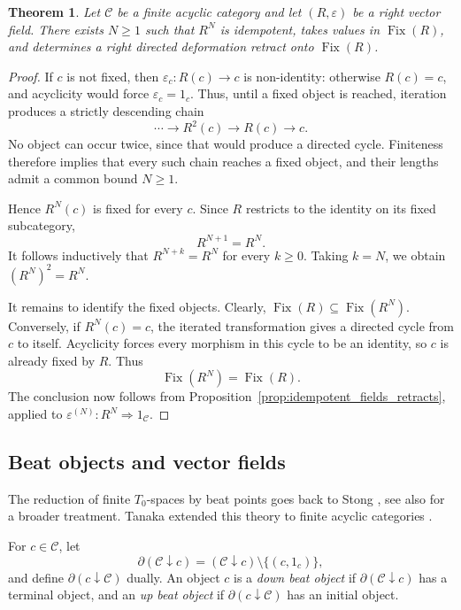 \documentclass[12pt]{amsart}
\newtheorem{theorem}[teo]{Theorem}
\theoremstyle{definition}
\theoremstyle{remark}
\numberwithin{figure}{section}%
\newcommand{\CC}{\mathcal{C}}
\begin{document}
\begin{theorem}\label{thm:vector_field_stabilization}
Let \(\CC\) be a finite acyclic category and let
\((R,\varepsilon)\) be a right vector field. There exists \(N\geq1\) such
that \(R^N\) is idempotent, takes values in
\(\operatorname{Fix}(R)\), and determines a right directed deformation
retract onto \(\operatorname{Fix}(R)\).
\end{theorem}

\begin{proof}
If \(c\) is not fixed, then \(\varepsilon_c\colon R(c)\to c\) is
non-identity: otherwise \(R(c)=c\), and acyclicity would force
\(\varepsilon_c=1_c\). Thus, until a fixed object is reached, iteration
produces a strictly descending chain
\[
\cdots\longrightarrow R^2(c)\longrightarrow R(c)\longrightarrow c.
\]
No object can occur twice, since that would produce a directed cycle.
Finiteness therefore implies that every such chain reaches a fixed
object, and their lengths admit a common bound \(N\geq1\).

Hence \(R^N(c)\) is fixed for every \(c\). Since \(R\) restricts to the
identity on its fixed subcategory,
\[
R^{N+1}=R^N.
\]
It follows inductively that \(R^{N+k}=R^N\) for every \(k\geq0\).
Taking \(k=N\), we obtain \((R^N)^2=R^N\).

It remains to identify the fixed objects. Clearly,
\(\operatorname{Fix}(R)\subseteq\operatorname{Fix}(R^N)\). Conversely,
if \(R^N(c)=c\), the iterated transformation gives a directed cycle from
\(c\) to itself. Acyclicity forces every morphism in this cycle to be an
identity, so \(c\) is already fixed by \(R\). Thus
\[
\operatorname{Fix}(R^N)=\operatorname{Fix}(R).
\]
The conclusion now follows from
Proposition~\ref{prop:idempotent_fields_retracts}, applied to
\(\varepsilon^{(N)}\colon R^N\Rightarrow1_\CC\).
\end{proof}

\subsection{Beat objects and vector fields}
\label{subsec:beat_objects_vector_fields}

The reduction of finite \(T_0\)-spaces by beat points goes back to Stong
\cite{Stong}, see also \cite{MR3024764} for a broader treatment. Tanaka extended this theory to finite acyclic categories \cite{StrongHomTan,SimpleHom_Tan}.

For \(c\in\CC\), let
\[
\partial(\CC\downarrow c)
=
(\CC\downarrow c)\setminus\{(c,1_c)\},
\]
and define \(\partial(c\downarrow\CC)\) dually. An object \(c\) is a
\emph{down beat object} if \(\partial(\CC\downarrow c)\) has a terminal
object, and an \emph{up beat object} if
\(\partial(c\downarrow\CC)\) has an initial object.
\end{document}
